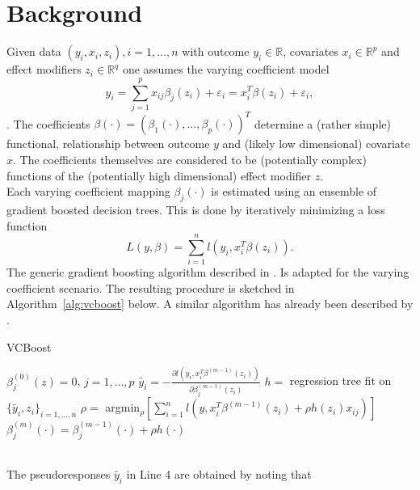\documentclass{article}
\begin{document}
\section{Background}

Given data $(y_i, x_i, z_i), i = 1, \dots, n$ with outcome $y_i \in \mathbb{R}$, covariates $x_i \in \mathbb{R}^p$ and effect modifiers $z_i \in \mathbb{R}^q$ one assumes the varying coefficient model
%
\begin{equation}
y_i = \sum_{j=1}^p x_{ij} \beta_j(z_i) + \varepsilon_i = x_i^T \beta(z_i) + \varepsilon_i,
\end{equation}
%
\cite{hastie1993varying}. The coefficients $\beta(\cdot) = (\beta_1(\cdot), \dots, \beta_p(\cdot))^T$ determine a (rather simple) functional, relationship between outcome $y$ and (likely low dimensional) covariate $x$. The coefficients themselves are considered to be (potentially complex) functions of the (potentially high dimensional) effect modifier $z$.\\
Each varying coefficient mapping $\beta_j(\cdot)$ is estimated using an ensemble of gradient
boosted decision trees. This is done by iteratively minimizing a loss function
%
\begin{equation}
    L(y, \beta) = \sum_{i=1}^n l(y_i, x_i^T\beta(z_i)).
\end{equation}
%
The generic gradient boosting algorithm described in \cite{friedman2001greedy}. Is adapted for the varying coefficient scenario. The resulting procedure is sketched in Algorithm~\ref{alg:vcboost} below. A similar algorithm has already been described by \cite{zhou2019tree}.
%
\begin{algorithm}[h]
\caption{VCBoost}
\label{alg:vcboost}
	\begin{algorithmic}[1]
		\State $\beta_j^{(0)}(z) = 0$, $j = 1, \dots, p$
				\State $\tilde{y_i} = - \frac{\partial l(y_i, x_i^T\beta^{(m-1)}(z_i))}{\partial \beta_j^{(m-1)}(z_i)}$ 
				\State $h = $ regression tree fit on $\{\tilde{y_i}, z_i\}_{i=1, \dots, n}$
				\State $\rho = $ argmin$_{\rho} \left[ \sum_{i=1}^n l (y, x_i^T\beta^{(m-1)}(z_i) + \rho h(z_i) x_{ij}) \right]$ 
				\State $\beta_j^{(m)}(\cdot) = \beta_j^{(m-1)}(\cdot) + \rho h(\cdot)$
			\EndFor
		\EndFor
	\end{algorithmic}
\end{algorithm}\\
%
The pseudoresponses $\tilde{y_i}$ in Line 4 are obtained by noting that
\end{document}
